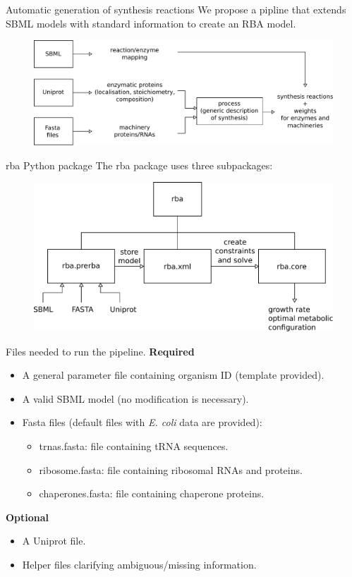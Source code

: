 \documentclass{beamer}
\begin{document}
\begin{frame}{Automatic generation of synthesis reactions}
  We propose a pipline that extends SBML models with standard information
  to create an RBA model.
  \begin{figure}
    \centering
    \includegraphics[width=\linewidth]{pipeline_idea}
  \end{figure}
\end{frame}

\begin{frame}{rba Python package}
  The rba package uses three subpackages:
  \begin{figure}
    \centering
    \includegraphics[width=\linewidth]{package_structure}
  \end{figure}
\end{frame}

\begin{frame}{Files needed to run the pipeline.}
  \textbf{Required}
  \begin{itemize}
    \item A general parameter file containing organism ID (template provided).
    \item A valid SBML model (no modification is necessary).
    \item Fasta files (default files with \textit{E. coli} data are provided):
    \begin{itemize}
      \item trnas.fasta: file containing tRNA sequences.
      \item ribosome.fasta: file containing ribosomal RNAs and proteins.
      \item chaperones.fasta: file containing chaperone proteins.
    \end{itemize}
  \end{itemize}
  \textbf{Optional}
  \begin{itemize}
    \item A Uniprot file.
    \item Helper files clarifying ambiguous/missing information.
  \end{itemize}
\end{frame}
\end{document}

